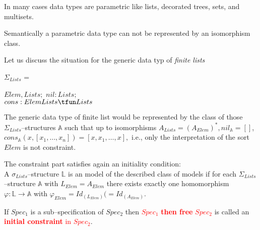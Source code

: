 \documentclass[landscape, autoslides, light]{mmiss}
\begin{document}
\begin{Package}[Label={FSDPT}, Title={Formal Specification of Data and Process Types}, ShortTitle={FSDPT}, Authors={Horst Reichel}, Date={February 2003}, LevelOfDetail=Lecture, Language=en-GB]
\begin{Section}[Title={Initial Algebras as Data Types}, Label={section3}]
\begin{Section}[Title={Generic Specifications}, Label={section3_4}]
\begin{Paragraph}

\end{Paragraph}
\begin{Paragraph}[Label=Paragraph57]
\small
In many cases data types are parametric like lists, decorated
trees, sets, and multisets.\pause

Semantically a parametric data type can not be represented by an
isomorphism class. \pause

Let us discuss the situation for the generic data typ of
\emph{finite lists}

\(\Sigma_{Lists}\) = \begin{BasicSpec} \I\Sorts \( Elem, Lists;\)
\I\Ops \( nil : Lists; \)
\\ \( cons : Elem \* Lists \tfun Lists \)
\end{BasicSpec}


\end{Paragraph}
\begin{Paragraph}[Label=Paragraph58]
The generic data type of finite list would be represented by the
 class of  those $\Sigma_{Lists}$--structures $\mathbb{A}$
such that up to isomorphisms $ A_{Lists} = (A_{Elem})^*,
nil_{\mathbb A} = []$, $ cons_{\mathbb A} (x, [x_1, \ldots , x_n])
= [x,x_1, \ldots,x ],$ i.e., only the interpretation of the sort
$Elem$ is not constraint. \pause

The constraint part satisfies again an initiality condition:\\
\pause A $\sigma_{Lists}$--structure $\mathbb L$ is an model of
the described class of models if for each
$\Sigma_{Lists}$--structure $\mathbb A$ with $L_{Elem} = A_{Elem}$
there exists exactly one homomorphism $\varphi : {\mathbb L} \to
{\mathbb A}$ with $\varphi_{Elem} = Id_{(L_{Elem})} (=
Id_{(A_{Elem})}$.


\end{Paragraph}
\begin{Paragraph}[Label=Paragraph59]
\small
\begin{Definition}[Title = {Initial Algebras as Data Types}, Label = {Definition2}]
If $Spec_1$ is a sub--specification of $Spec_2$ then
\textcolor{red}{ $Spec_1$ \textbf{then free} $Spec_2$} is called
an \textcolor{red}{\textbf{initial constraint} in $Spec_2$}.


\end{Definition}
\end{Paragraph}
\end{Section}
\end{Section}
\end{Package}
\end{document}
